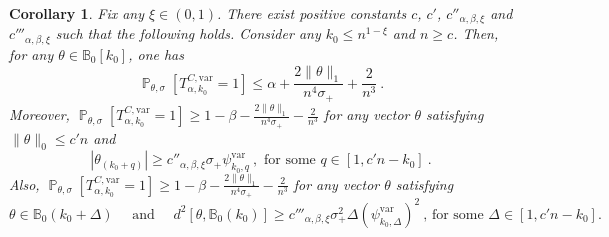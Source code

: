 \documentclass[twoside,11pt]{article}
\newtheorem{cor}{Corollary}
\def\beq{\begin{equation}}
\def\eeq{\end{equation}}
\def\bbB{\mathbb{B}}
\renewcommand{\P}{\operatorname{\mathbb{P}}}
\newcommand{\<}{\langle}
\renewcommand{\>}{\rangle}
\begin{document}
\begin{cor}\label{cor:power_combined2ubv}
Fix any $\xi\in (0,1)$.
 There exist  positive constants $c$, $c'$, $c''_{\alpha,\beta,\xi}$ and $c'''_{\alpha,\beta,\xi}$ such that the following holds. Consider any $k_0\leq n^{1-\xi}$ and $n\geq c$. 
 Then, for any $\theta\in \bbB_{0}[k_0]$, one has 
 \[
  \P_{\theta,\sigma}[T^{C,\mathrm{var}}_{\alpha,k_0}=1]\leq \alpha + \frac{2\|\theta\|_1}{n^4\sigma_+}+ \frac{2}{n^3}\ . 
 \]
Moreover,
 $\P_{\theta,\sigma}[T^{C,\mathrm{var}}_{\alpha,k_0}=1]\geq 1-\beta-  \frac{2\|\theta\|_1}{n^4\sigma_+}- \frac{2}{n^3}$ for any vector $\theta$ satisfying $\|\theta\|_0\leq c'n$ and
 \beq\label{eq:upper_adaptatif_linfiniuv2}
 |\theta_{(k_0+q)}| \geq c''_{\alpha,\beta,\xi}\sigma_+\psi_{k_0,q}^{\mathrm{var}}\ , \text{ for some } q\in [1,c'n-k_0]\ .
 \eeq
  Also,  $\P_{\theta,\sigma}[T^{C,\mathrm{var}}_{\alpha,k_0}=1]\geq 1-\beta- \frac{2\|\theta\|_1}{n^4\sigma_+}- \frac{2}{n^3}$ for any vector $\theta$ satisfying  
 \beq\label{eq:upper_adaptatif_l2uv2}
  \theta\in \mathbb{B}_0(k_0+\Delta)\quad  \text{ and }\quad  d^2[\theta,\mathbb{B}_0(k_0)] \geq c'''_{\alpha,\beta,\xi} \sigma_+^2\Delta(\psi_{k_0,\Delta}^{\mathrm{var}})^2\ ,\, \text{for some $\Delta\in [1,c'n-k_0]$.}
 \eeq
\end{cor}
 
\end{document}
